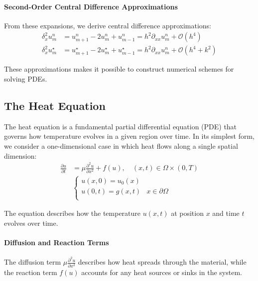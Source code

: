 \paragraph{Second-Order Central Difference Approximations}
From these expansions, we derive central difference approximations:
\begin{align}
  \delta_x^2 u_m^n     & = u_{m+1}^n - 2u_m^n + u_{m-1}^n = h^2\partial_{xx}u_m^n + \mathcal{O}(h^4) \tag{T7} \label{eq:central_diff}                        \\
  \delta_x^2 u_m^\star & = u_{m+1}^\star - 2u_m^\star + u_{m-1}^\star = h^2\partial_{xx}u_m^n + \mathcal{O}(h^4 + k^2) \tag{T8} \label{eq:central_diff_star}
\end{align}

These approximations makes it possible to construct numerical schemes for solving PDEs.

\subsection{The Heat Equation}

The heat equation is a fundamental partial differential equation (PDE) that governs how temperature evolves in a given region over time. In its simplest form, we consider a one-dimensional case in which heat flows along a single spatial dimension:
\begin{align*}
  \frac{\partial u}{\partial t} & = \mu \frac{\partial^2 u}{\partial x^2} + f(u), \quad \left( x, t \right) \in \Omega \times \left(0, T\right) \tag{PDE} \\
                                &
  \begin{cases}
    u(x, 0) = u_0(x)  &                       \\
    u(0, t) = g(x, t) & x \in \partial \Omega \\
  \end{cases} \tag{BC}
\end{align*}\label{eq:heat_eq}

The equation describes how the temperature \(u(x, t)\) at position \(x\) and time \(t\) evolves over time.

\paragraph{Diffusion and Reaction Terms}
The diffusion term \(\mu \frac{\partial^2 u}{\partial x^2}\) describes how heat spreads through the material, while the reaction term \(f(u)\) accounts for any heat sources or sinks in the system.

